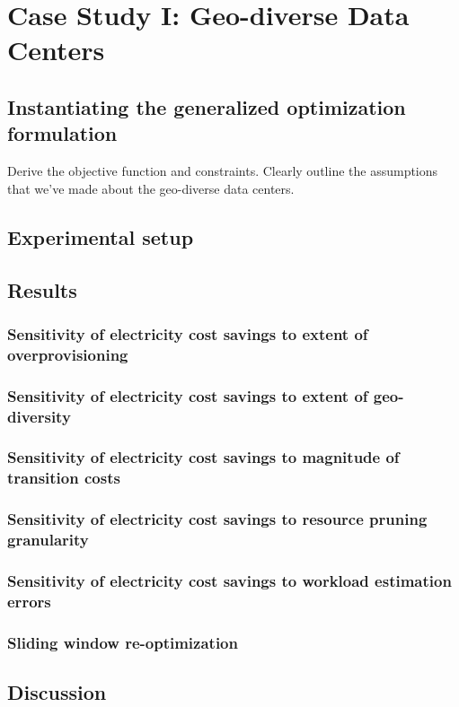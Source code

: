 \chapter{Case Study I: Geo-diverse Data Centers}
\label{chap:casestudy1}
\section{Instantiating the generalized optimization formulation} Derive the objective function and constraints. Clearly outline the assumptions that we've made about the geo-diverse data centers.

\section{Experimental setup} 

\section{Results}
\subsection{Sensitivity of electricity cost savings to extent of overprovisioning}
\subsection{Sensitivity of electricity cost savings to extent of geo-diversity}
\subsection{Sensitivity of electricity cost savings to magnitude of transition costs}
\subsection{Sensitivity of electricity cost savings to resource pruning granularity}
\subsection{Sensitivity of electricity cost savings to workload estimation errors}
\subsection{Sliding window re-optimization}

\section{Discussion}
